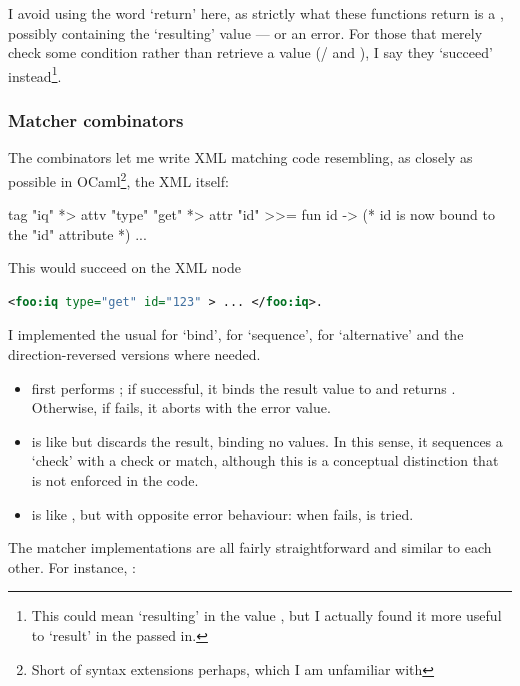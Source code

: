 \documentclass[12pt,a4paper,twoside,openright]{report}
\begin{document}
{I avoid using the word `return' here, as strictly what these functions return is a , possibly containing the `resulting' value --- or an error. For those that merely check some condition rather than retrieve a value (/ and ), I say they `succeed' instead\footnote{This could mean `resulting' in the value \code{()}, but I actually found it more useful to `result' in the  passed in.}.

\subsubsection{Matcher combinators}
The combinators let me write XML matching code resembling, as closely as possible in OCaml\footnote{Short of syntax extensions perhaps, which I am unfamiliar with}, the XML itself:

\begin{ocaml}
tag "iq" *> attv "type" "get" *> attr "id" >>= fun id ->
  (* id is now bound to the "id" attribute *)
  ...
\end{ocaml}

This would succeed on the XML node
\begin{lstlisting}[language=xml]
<foo:iq type="get" id="123" > ... </foo:iq>.
\end{lstlisting}

I implemented the usual \code{>>=} for `bind', \code{*>} for `sequence', \code{<|>} for `alternative' and the direction-reversed versions where needed.

\begin{itemize}
  \item {} first performs ; if successful, it binds the result value to  and returns . Otherwise, if  fails, it aborts with the error value.

  \item {} is like \code{>>=} but discards the result, binding no values. In this sense, it sequences a `check' with a check or match, although this is a conceptual distinction that is not enforced in the code.

  \item {} is like \code{*>}, but with opposite error behaviour: when  fails,  is tried.
\end{itemize}

The matcher implementations are all fairly straightforward and similar to each other. For instance, :

}
\end{document}
